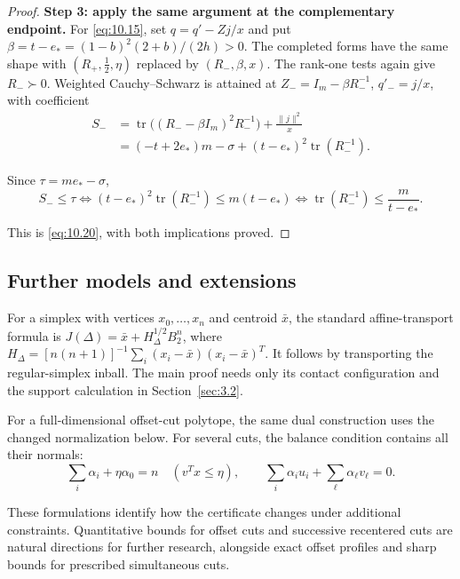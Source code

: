 \begin{proof}
\textbf{Step 3: apply the same argument at the complementary endpoint.}
For \eqref{eq:10.15}, set $q=q'-Zj/x$ and put
$\beta=t-e_*=(1-b)^2(2+b)/(2h)>0$. The completed forms have the same shape with
$(R_+,\tfrac12,\eta)$ replaced by $(R_-,\beta,x)$. The rank-one tests again give $R_-\succ0$. Weighted Cauchy--Schwarz is attained at
$Z_-=I_m-\beta R_-^{-1}$, $q'_-=j/x$, with coefficient
\begin{equation}\label{eq:10.24}
\begin{aligned}
S_-
&=\operatorname{tr}\bigl((R_--\beta I_m)^2R_-^{-1}\bigr)
+\frac{\|j\|^2}{x}\\
&=(-t+2e_*)m-\sigma+(t-e_*)^2\operatorname{tr}(R_-^{-1}).
\end{aligned}
\end{equation}

Since $\tau=me_*-\sigma$,
\begin{equation}\label{eq:10.25}
S_-\le\tau
\iff (t-e_*)^2\operatorname{tr}(R_-^{-1})\le m(t-e_*)
\iff \operatorname{tr}(R_-^{-1})\le\frac{m}{t-e_*}.
\end{equation}

This is \eqref{eq:10.20}, with both implications proved. 
\end{proof}

\subsection{Further models and extensions}\label{sec:10.6}

For a simplex with vertices $x_0,\ldots,x_n$ and centroid $\bar x$, the standard
affine-transport formula is $J(\Delta)=\bar x+H_\Delta^{1/2}B_2^n$, where
$H_\Delta=[n(n+1)]^{-1}\sum_i(x_i-\bar x)(x_i-\bar x)^T$.
It follows by transporting the regular-simplex inball. The main proof needs
only its contact configuration and the support calculation in Section~\ref{sec:3.2}.

For a full-dimensional offset-cut polytope, the same dual construction uses
the changed normalization below. For several cuts, the balance condition
contains all their normals:
\begin{equation}\label{eq:10.26}
\sum_i\alpha_i+\eta\alpha_0=n\quad(v^Tx\le\eta),\qquad
\sum_i\alpha_iu_i+\sum_\ell\alpha_\ell v_\ell=0.
\end{equation}

These formulations identify how the certificate changes under additional constraints. Quantitative bounds for offset cuts and successive recentered cuts are natural directions for further research, alongside exact offset profiles and sharp bounds for prescribed simultaneous cuts.

